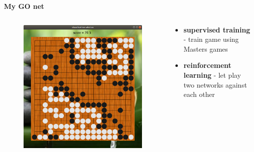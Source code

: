 \documentclass[xcolor=dvipsnames]{beamer}
\begin{document}
\begin{frame}{\bf My GO net}


  \begin{columns}
  \begin{column}{0.5\textwidth}

    \begin{figure}[!htb]
      \centering
      \includegraphics[scale=0.18]{../../pictures/go_board.png}
    \end{figure}


  \end{column}
  \begin{column}{0.5\textwidth}  %

    \scriptsize
    {
      \begin{itemize}
        \item {\bf supervised training} - train game using Masters games
        \item {\bf reinforcement learning} - let play two networks against each other
      \end{itemize}
    }
  \end{column}
  \end{columns}

\end{frame}
\end{document}
